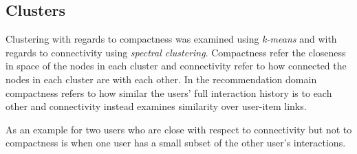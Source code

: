 

\newpage
\subsection{Clusters}\label{sec:result:clusters}

Clustering with regards to compactness was examined using \textit{k-means} and with regards to connectivity using \textit{spectral clustering}. Compactness refer the closeness in space of the nodes in each cluster and connectivity refer to how connected the nodes in each cluster are with each other. In the recommendation domain compactness refers to how similar the users' full interaction history is to each other and connectivity instead examines similarity over user-item links.

As an example for two users who are close with respect to connectivity but not to compactness is when one user has a small subset of the other user's interactions.



\newpage


\newpage

